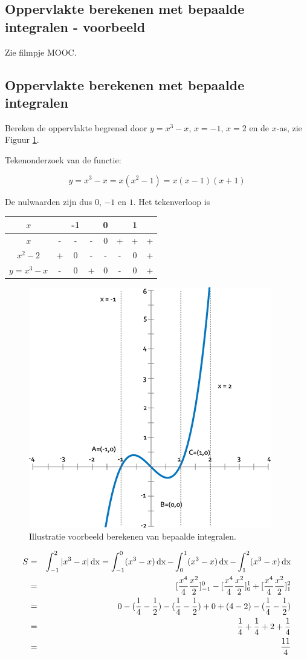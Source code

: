 \subsection{Oppervlakte berekenen met bepaalde integralen - voorbeeld}
Zie filmpje MOOC.

\subsection{Oppervlakte berekenen met bepaalde integralen}

\begin{voorbeeld}
Bereken de oppervlakte begrensd door $y=x^3-x$, $x=-1$, $x=2$ en de $x$-as, zie Figuur \ref{fig:int:4}.

Tekenonderzoek van de functie:

\begin{equation*}
y=x^3-x=x(x^2-1)=x(x-1)(x+1)
\end{equation*}

De nulwaarden zijn dus $0$, $-1$ en $1$. Het tekenverloop is
\begin{center}
	\begin{tabular}{c|ccccccc}
	$x$ & & -1 & & 0 & & 1 & \\
	\hline
	$x$ & - & - & -& 0 & + & + & + \\
	$x^2-2$ & + & 0 & -& - & - & 0 & + \\
	\hline 
	$y=x^3-x$ & - & 0 & +& 0 & - & 0 & + 
	\end{tabular}
\end{center}

\begin{figure}
	\centering
	\includegraphics[width=0.5\linewidth]{6_afgeleiden_integralen/inputs/integraal4}
	\caption{Illustratie voorbeeld berekenen van bepaalde integralen.}
	\label{fig:int:4}
\end{figure}

\begin{eqnarray*}
S &=& \int_{-1}^{2}|x^3-x|\operatorname{dx} = \int_{-1}^{0}(x^3-x)\operatorname{dx} - \int_{0}^{1}(x^3-x)\operatorname{dx} - \int_{1}^{2}(x^3-x)\operatorname{dx} \\
&=& [\frac{x^4}{4}\frac{x^2}{2}]_{-1}^{0} - [\frac{x^4}{4}\frac{x^2}{2}]_{0}^{1} + [\frac{x^4}{4}\frac{x^2}{2}]_{1}^{2} \\
&=& 0 - (\frac{1}{4}-\frac{1}{2}) - (\frac{1}{4}-\frac{1}{2}) + 0 + (4-2) - (\frac{1}{4}-\frac{1}{2}) \\
&=& \frac{1}{4} + \frac{1}{4} + 2 + \frac{1}{4} \\
&=& \frac{11}{4}
\end{eqnarray*}


\end{voorbeeld}
